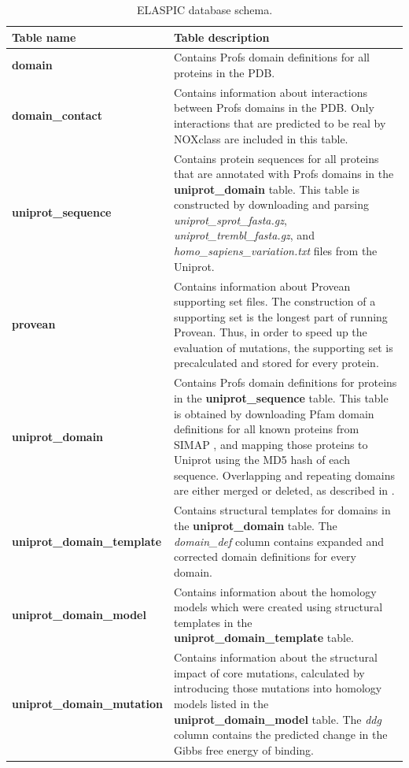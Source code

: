 \begin{table}[ht]
\caption{ELASPIC database schema.} \label{tab:elaspic_database_schema}
\begin{tabular}{l | p{10cm}}
	\toprule
	Table name & Table description \\
	\midrule
	\textbf{domain} & Contains Profs domain definitions for all proteins in the PDB. \\
	\textbf{domain\_contact} & Contains information about interactions between Profs domains in the PDB. Only interactions that are predicted to be real by NOXclass \cite{zhu_noxclass:_2006} are included in this table. \\
	\textbf{uniprot\_sequence} & Contains protein sequences for all proteins that are annotated with Profs domains in the \textbf{uniprot\_domain} table. This table is constructed by downloading and parsing \textit{uniprot\_sprot\_fasta.gz}, \textit{uniprot\_trembl\_fasta.gz}, and \textit{homo\_sapiens\_variation.txt} files from the Uniprot. \\
	\textbf{provean} & Contains information about Provean \cite{choi_predicting_2012} supporting set files. The construction of a supporting set is the longest part of running Provean. Thus, in order to speed up the evaluation of mutations, the supporting set is precalculated and stored for every protein. \\
	\textbf{uniprot\_domain} & Contains Profs domain definitions for proteins in the \textbf{uniprot\_sequence} table. This table is obtained by downloading Pfam domain definitions for all known proteins from SIMAP \cite{rattei_simapcomprehensive_2010}, and mapping those proteins to Uniprot using the MD5 hash of each sequence. Overlapping and repeating domains are either merged or deleted, as described in \cite{witvliet_elaspic_2016}. \\
	\textbf{uniprot\_domain\_template} & Contains structural templates for domains in the \textbf{uniprot\_domain} table. The \textit{domain\_def} column contains expanded and corrected domain definitions for every domain. \\
	\textbf{uniprot\_domain\_model} & Contains information about the homology models which were created using structural templates in the \textbf{uniprot\_domain\_template} table. \\
	\textbf{uniprot\_domain\_mutation} & Contains information about the structural impact of core mutations, calculated by introducing those mutations into homology models listed in the \textbf{uniprot\_domain\_model} table. The \textit{ddg} column contains the predicted change in the Gibbs free energy of binding. \\

\end{tabular}
\end{table}
